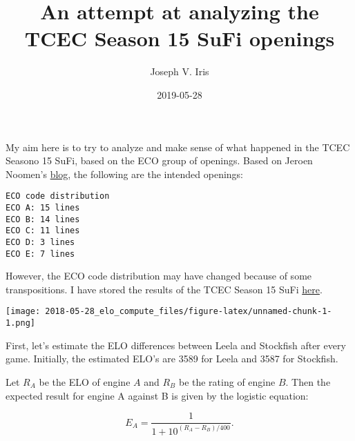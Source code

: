 \documentclass[]{article}
\title{An attempt at analyzing the TCEC Season 15 SuFi openings}
\author{Joseph V. Iris}
\date{2019-05-28}
\newenvironment{Shaded}{\begin{snugshade}}{\end{snugshade}}
\newcommand{\DataTypeTok}[1]{\textcolor[rgb]{0.13,0.29,0.53}{#1}}
\newcommand{\KeywordTok}[1]{\textcolor[rgb]{0.13,0.29,0.53}{\textbf{#1}}}
\newcommand{\NormalTok}[1]{#1}
\newcommand{\OperatorTok}[1]{\textcolor[rgb]{0.81,0.36,0.00}{\textbf{#1}}}
\newcommand{\StringTok}[1]{\textcolor[rgb]{0.31,0.60,0.02}{#1}}
\begin{document}
\maketitle

My aim here is to try to analyze and make sense of what happened in the
TCEC Seasono 15 SuFi, based on the ECO group of openings. Based on
Jeroen Noomen's
\href{http://blogchess2016.blogspot.com/2019/04/opening-selection-tcec-15-superfinal.html}{blog},
the following are the intended openings:

\begin{verbatim}
ECO code distribution
ECO A: 15 lines
ECO B: 14 lines
ECO C: 11 lines
ECO D: 3 lines
ECO E: 7 lines
\end{verbatim}

However, the ECO code distribution may have changed because of some
transpositions. I have stored the results of the TCEC Season 15 SuFi
\href{https://raw.githubusercontent.com/josephviruses/josephviruses.github.io/master/content/post/leelasf2.csv}{here}.

\begin{Shaded}
\end{Shaded}

\texttt{[image: 2018-05-28\_elo\_compute\_files/figure-latex/unnamed-chunk-1-1.png]}

First, let's estimate the ELO differences between Leela and Stockfish
after every game. Initially, the estimated ELO's are 3589 for Leela and
3587 for Stockfish.

Let \(R_A\) be the ELO of engine \(A\) and \(R_B\) be the rating of
engine \(B\). Then the expected result for engine A against B is given
by the logistic equation:

\begin{equation}
E_A = \frac{1}{1+10^{(R_A-R_B)/400}}.
\end{equation}
\end{document}
